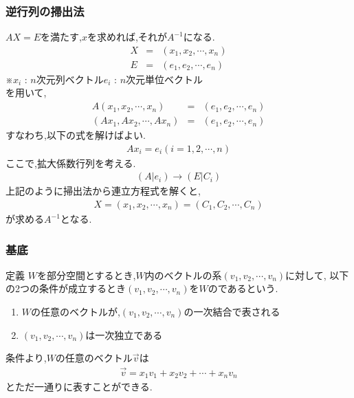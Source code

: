 \documentclass[a4paper]{jsarticle}
\begin{document}
\subsubsection{逆行列の掃出法}
$AX=E$\quad を満たす,$x$を求めれば,それが$A^{-1}$になる.
\begin{eqnarray*}
    X&=&\left(x_1,x_2,\cdots,x_n\right)\\
    E&=&\left(e_1,e_2,\cdots,e_n\right)
\end{eqnarray*}
※$x_i$ : $n$次元列ベクトル\quad $e_i$ : $n$次元単位ベクトル\\
を用いて,
\begin{eqnarray*}
    A\left(x_1,x_2,\cdots,x_n\right)&=&\left(e_1,e_2,\cdots,e_n\right)\\
    \left(Ax_1,Ax_2,\cdots,Ax_n\right)&=&\left(e_1,e_2,\cdots,e_n\right)
\end{eqnarray*}
すなわち,以下の式を解けばよい.
\begin{eqnarray*}
    Ax_i=e_i \left(i=1,2,\cdots,n\right)
\end{eqnarray*}
ここで,拡大係数行列を考える.
\begin{eqnarray*}
    \left(A|e_i\right) \rightarrow \left(E|C_i\right)
\end{eqnarray*}
上記のように掃出法から連立方程式を解くと,
\begin{eqnarray*}
    X=\left(x_1,x_2,\cdots,x_n\right)=\left(C_1,C_2,\cdots,C_n\right)
\end{eqnarray*}
が求める$A^{-1}$となる.
\subsubsection{基底}
\begin{itembox}[l]{定義}
    $W$を部分空間とするとき,$W$内のベクトルの系$\left(v_1,v_2,\cdots,v_n\right)$に対して,
    以下の2つの条件が成立するとき$\left(v_1,v_2,\cdots,v_n\right)$を$W$のであるという.
    \begin{enumerate}[(1)]
        \item $W$の任意のベクトルが,$\left(v_1,v_2,\cdots,v_n\right)$の一次結合で表される
        \item $\left(v_1,v_2,\cdots,v_n\right)$は一次独立である
    \end{enumerate}
\end{itembox}
条件より,$W$の任意のベクトル$\vec{v}$は
\begin{eqnarray*}
    \vec{v}=x_1v_1+x_2v_2+\cdots+x_nv_n
\end{eqnarray*}
とただ一通りに表すことができる.
\end{document}
